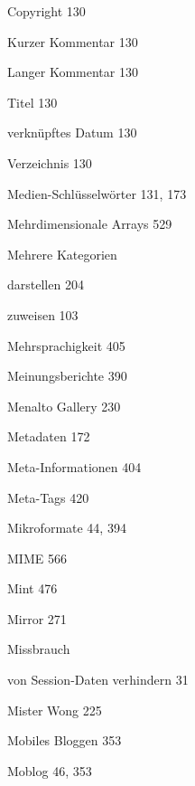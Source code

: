 \documentclass{book}
\renewcommand\subitem{\par}
\begin{document}
\begin{multicols}{2}
\begin{osp-index}
    \subitem Copyright\hspace{1mm} 130
    \subitem Kurzer Kommentar\hspace{1mm} 130
    \subitem Langer Kommentar\hspace{1mm} 130
    \subitem Titel\hspace{1mm} 130
    \subitem verkn\"upftes Datum\hspace{1mm} 130
    \subitem Verzeichnis\hspace{1mm} 130
  \item Medien-Schl\"usselw\"orter\hspace{1mm} 131, 173
  \item Mehrdimensionale Arrays\hspace{1mm} 529
  \item Mehrere Kategorien
    \subitem darstellen\hspace{1mm} 204
    \subitem zuweisen\hspace{1mm} 103
  \item Mehrsprachigkeit\hspace{1mm} 405
  \item Meinungsberichte\hspace{1mm} 390
  \item Menalto Gallery\hspace{1mm} 230
  \item Metadaten\hspace{1mm} 172
  \item Meta-Informationen\hspace{1mm} 404
  \item Meta-Tags\hspace{1mm} 420
  \item Mikroformate\hspace{1mm} 44, 394
  \item MIME\hspace{1mm} 566
  \item Mint\hspace{1mm} 476
  \item Mirror\hspace{1mm} 271
  \item Missbrauch
    \subitem von Session-Daten verhindern\hspace{1mm} 31
  \item Mister Wong\hspace{1mm} 225
  \item Mobiles Bloggen\hspace{1mm} 353
  \item Moblog\hspace{1mm} 46, 353

\end{osp-index}
\end{multicols}
\end{document}
